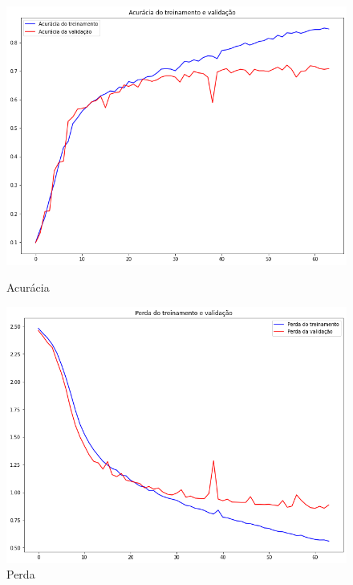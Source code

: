 \documentclass[12pt]{article}
\begin{document}
\begin{figure}[!htb]
  \begin{minipage}{.47\textwidth}
    \centering
    \includegraphics[width=1.1\linewidth]{experiments/lenet5_noaug_64/accuracy.png}
    \caption{Acurácia}\label{fig:experiment_lenet5_noaug_64_accuracy}
  \end{minipage}\hfill
  \begin{minipage}{.47\textwidth}
    \centering
    \includegraphics[width=1.1\linewidth]{experiments/lenet5_noaug_64/loss.png}
    \caption{Perda}\label{fig:experiment_lenet5_noaug_64_loss}
  \end{minipage}
\end{figure}
\end{document}
